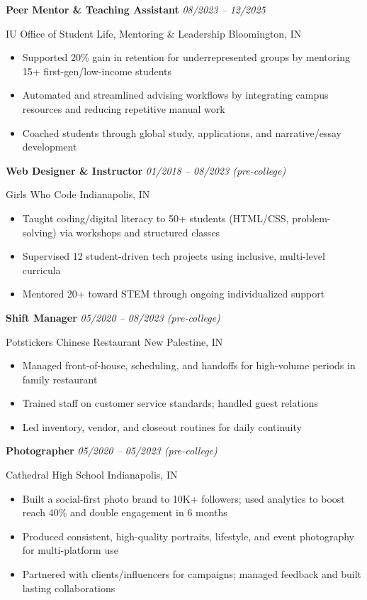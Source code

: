 \documentclass[10pt]{article}
\newcommand{\exphead}[3]{%
  \noindent\textbf{#1} \hfill \textit{#3}\par
  \noindent #2\par
  \vspace{1pt}%
}
\newcommand{\expgap}{\vspace{3.5pt}}
\begin{document}
\expgap
\exphead{Peer Mentor \& Teaching Assistant}{IU Office of Student Life, Mentoring \& Leadership \hfill Bloomington, IN}{08/2023 -- 12/2025}
\begin{itemize}
  \item Supported 20\% gain in retention for underrepresented groups by mentoring 15+ first-gen/low-income students
  \item Automated and streamlined advising workflows by integrating campus resources and reducing repetitive manual work
  \item Coached students through global study, applications, and narrative/essay development
\end{itemize}

\expgap
\exphead{Web Designer \& Instructor}{Girls Who Code \hfill Indianapolis, IN}{01/2018 -- 08/2023 (pre-college)}
\begin{itemize}
  \item Taught coding/digital literacy to 50+ students (HTML/CSS, problem-solving) via workshops and structured classes
  \item Supervised 12 student-driven tech projects using inclusive, multi-level curricula
  \item Mentored 20+ toward STEM through ongoing individualized support
\end{itemize}

\expgap
\exphead{Shift Manager}{Potstickers Chinese Restaurant \hfill New Palestine, IN}{05/2020 -- 08/2023 (pre-college)}
\begin{itemize}
  \item Managed front-of-house, scheduling, and handoffs for high-volume periods in family restaurant
  \item Trained staff on customer service standards; handled guest relations
  \item Led inventory, vendor, and closeout routines for daily continuity
\end{itemize}

\expgap
\exphead{Photographer}{Cathedral High School \hfill Indianapolis, IN}{05/2020 -- 05/2023 (pre-college)}
\begin{itemize}
  \item Built a social-first photo brand to 10K+ followers; used analytics to boost reach 40\% and double engagement in 6 months
  \item Produced consistent, high-quality portraits, lifestyle, and event photography for multi-platform use
  \item Partnered with clients/influencers for campaigns; managed feedback and built lasting collaborations
\end{itemize}
\end{document}
